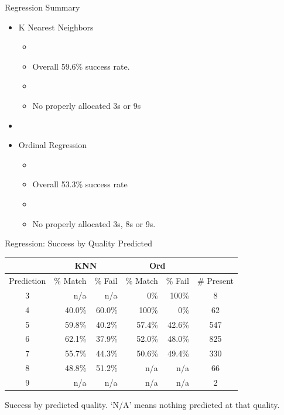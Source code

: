 \documentclass{beamer}
\begin{document}
\begin{frame}{Regression Summary}
	\begin{itemize}
	\item K Nearest Neighbors
	\begin{itemize}
		\item[]
		\item Overall 59.6\% success rate.
		\item[]
		\item No properly allocated 3s or 9s
	\end{itemize}
	\item[]
	\item Ordinal Regression
	\begin{itemize}
		\item[]	
		\item Overall 53.3\% success rate
		\item[]		
		\item No properly allocated 3s, 8s or 9s.
	\end{itemize}
	
	\end{itemize}

\end{frame}

\begin{frame}{Regression: Success by Quality Predicted}
\begin{center}

\begin{tabular}{c | r r | r r | c}
	           & \multicolumn{2}{c|}{KNN} & \multicolumn{2}{c|}{Ord} &  \\ \hline
	Prediction & \% Match & \% Fail       & \% Match & \% Fail      & \# Present \\ \hline
	    3      & n/a      & n/a           & 0\%      & 100\%        & 8         \\
	    4      & 40.0\%   & 60.0\%        & 100\%    & 0\%          & 62        \\
	    5      & 59.8\%   & 40.2\%        & 57.4\%   & 42.6\%       & 547       \\
	    6      & 62.1\%   & 37.9\%        & 52.0\%   & 48.0\%       & 825       \\
	    7      & 55.7\%   & 44.3\%        & 50.6\%   & 49.4\%       & 330       \\
	    8      & 48.8\%   & 51.2\%        & n/a      & n/a          & 66        \\
	    9      & n/a      & n/a           & n/a      & n/a          & 2
\end{tabular}
Success by predicted quality. `N/A' means nothing predicted at that quality.
\end{center}
\end{frame}
\end{document}
